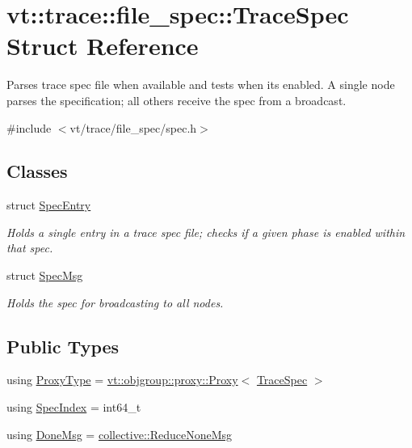 \hypertarget{structvt_1_1trace_1_1file__spec_1_1_trace_spec}{}\section{vt\+:\+:trace\+:\+:file\+\_\+spec\+:\+:Trace\+Spec Struct Reference}
\label{structvt_1_1trace_1_1file__spec_1_1_trace_spec}


Parses trace spec file when available and tests when its enabled. A single node parses the specification; all others receive the spec from a broadcast.  




{\ttfamily \#include $<$vt/trace/file\+\_\+spec/spec.\+h$>$}

\subsection*{Classes}
\begin{DoxyCompactItemize}
\item 
struct \hyperlink{structvt_1_1trace_1_1file__spec_1_1_trace_spec_1_1_spec_entry}{Spec\+Entry}
\begin{DoxyCompactList}\small\item\em Holds a single entry in a trace spec file; checks if a given phase is enabled within that spec. \end{DoxyCompactList}\item 
struct \hyperlink{structvt_1_1trace_1_1file__spec_1_1_trace_spec_1_1_spec_msg}{Spec\+Msg}
\begin{DoxyCompactList}\small\item\em Holds the spec for broadcasting to all nodes. \end{DoxyCompactList}\end{DoxyCompactItemize}
\subsection*{Public Types}
\begin{DoxyCompactItemize}
\item 
using \hyperlink{structvt_1_1trace_1_1file__spec_1_1_trace_spec_a26160cff9bb5115866943ed823405f1f}{Proxy\+Type} = \hyperlink{structvt_1_1objgroup_1_1proxy_1_1_proxy}{vt\+::objgroup\+::proxy\+::\+Proxy}$<$ \hyperlink{structvt_1_1trace_1_1file__spec_1_1_trace_spec}{Trace\+Spec} $>$
\item 
using \hyperlink{structvt_1_1trace_1_1file__spec_1_1_trace_spec_a4dd2e8fb971930351812d0f286baece2}{Spec\+Index} = int64\+\_\+t
\item 
using \hyperlink{structvt_1_1trace_1_1file__spec_1_1_trace_spec_a31fc42c00ddc382be9c198459793e1e9}{Done\+Msg} = \hyperlink{namespacevt_1_1collective_aa439a90f05078f2bcf918641c951946f}{collective\+::\+Reduce\+None\+Msg}
\end{DoxyCompactItemize}
